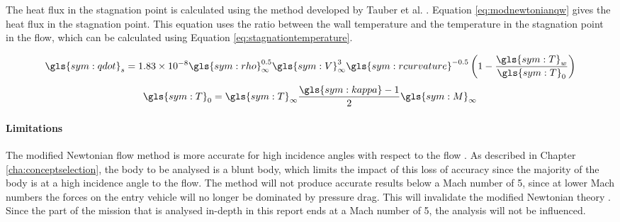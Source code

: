 The heat flux in the stagnation point is calculated using the method developed by Tauber et al. \cite{Tauber1986}. Equation \ref{eq:modnewtonianqw} gives the heat flux in the stagnation point. This equation uses the ratio between the wall temperature and the temperature in the stagnation point in the flow, which can be calculated using Equation \ref{eq:stagnationtemperature}\cite{AndersonJr.2006}.


	\begin{equation} \label{eq:modnewtonianqw}
		\gls{sym:qdot}_{s} = 1.83 \times 10^{-8} \gls{sym:rho}_{\infty}^{0.5} \gls{sym:V}_{\infty}^3  \gls{sym:rcurvature}^{-0.5} \left(1-\frac{\gls{sym:T}_{w}}{\gls{sym:T}_0}\right)
	\end{equation} \break
	\begin{equation}
		\gls{sym:T}_0 = \gls{sym:T}_\infty \frac{\gls{sym:kappa}-1}{2}\gls{sym:M}_\infty
		\label{eq:stagnationtemperature}
	\end{equation}
	


\paragraph{Limitations}
The modified Newtonian flow method is more accurate for high incidence angles with respect to the flow \cite{AndersonJr.2006}. As described in Chapter \ref{cha:conceptselection}, the body to be analysed is a blunt body, which limits the impact of this loss of accuracy since the majority of the body is at a high incidence angle to the flow. The method will not produce accurate results below a Mach number of 5, since at lower Mach numbers the forces on the entry vehicle will no longer be dominated by pressure drag. This will invalidate the modified Newtonian theory \cite{AndersonJr.2006}.
Since the part of the mission that is analysed in-depth in this report ends at a Mach number of 5, the analysis will not be influenced.

